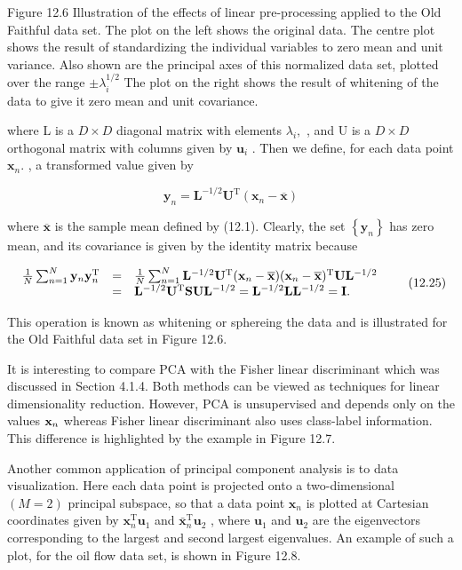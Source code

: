 \documentclass[
  10
]{article}
\begin{document}
Figure 12.6 Illustration of the effects of linear pre-processing applied
to the Old Faithful data set. The plot on the left shows the original
data. The centre plot shows the result of standardizing the individual
variables to zero mean and unit variance. Also shown are the principal
axes of this normalized data set, plotted over the range
\(\pm \lambda _ { i } ^ { 1 / 2 }\) The plot on the right shows the
result of whitening of the data to give it zero mean and unit
covariance.

where L is a \(D \times D\) diagonal matrix with elements
\(\lambda _ { i } ,\) , and U is a \(D \times D\) orthogonal matrix with
columns given by \(\mathbf { u } _ { i }\) . Then we define, for each
data point \(\mathbf { x } _ { n } .\) , a transformed value given by

\[
\mathbf {y} _ {n} = \mathbf {L} ^ {- 1 / 2} \mathbf {U} ^ {\mathrm{T}} (\mathbf {x} _ {n} - \overline {{\mathbf {x}}})\tag{12.24}
\]

where \(\overline { { \mathbf { x } } }\) is the sample mean defined by
(12.1). Clearly, the set \(\left\{ \mathbf { y } _ { n } \right\}\) has
zero mean, and its covariance is given by the identity matrix because

\[
\begin{array}{r c l} \frac {1}{N} \sum_ {n = 1} ^ {N} \mathbf {y} _ {n} \mathbf {y} _ {n} ^ {\mathrm{T}} & = & \frac {1}{N} \sum_ {n = 1} ^ {N} \mathbf {L} ^ {- 1 / 2} \mathbf {U} ^ {\mathrm{T}} (\mathbf {x} _ {n} - \overline {{\mathbf {x}}}) (\mathbf {x} _ {n} - \overline {{\mathbf {x}}}) ^ {\mathrm{T}} \mathbf {U} \mathbf {L} ^ {- 1 / 2} \\ & = & \mathbf {L} ^ {- 1 / 2} \mathbf {U} ^ {\mathrm{T}} \mathbf {S} \mathbf {U} \mathbf {L} ^ {- 1 / 2} = \mathbf {L} ^ {- 1 / 2} \mathbf {L} \mathbf {L} ^ {- 1 / 2} = \mathbf {I}. \end{array}\tag{12.25}
\]

This operation is known as whitening or sphereing the data and is
illustrated for the Old Faithful data set in Figure 12.6.

It is interesting to compare PCA with the Fisher linear discriminant
which was discussed in Section 4.1.4. Both methods can be viewed as
techniques for linear dimensionality reduction. However, PCA is
unsupervised and depends only on the values \({ \bf x } _ { n }\)
whereas Fisher linear discriminant also uses class-label information.
This difference is highlighted by the example in Figure 12.7.

Another common application of principal component analysis is to data
visualization. Here each data point is projected onto a two-dimensional
\(( M = 2 )\) principal subspace, so that a data point
\(\mathbf { x } _ { n }\) is plotted at Cartesian coordinates given by
\(\mathbf { x } _ { n } ^ { \mathrm { { T } } } \mathbf { u } _ { 1 }\)
and
\(\bar { \mathbf { x } } _ { n } ^ { \mathrm { { T } } } \mathbf { u } _ { 2 }\)
, where \(\mathbf { u _ { \mathrm { 1 } } }\) and
\(\mathbf { u } _ { 2 }\) are the eigenvectors corresponding to the
largest and second largest eigenvalues. An example of such a plot, for
the oil flow data set, is shown in Figure 12.8.
\end{document}
